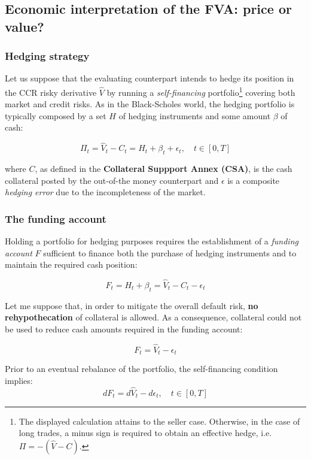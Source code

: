 \documentclass{beamer}
\begin{document}
\subsection{Economic interpretation of the FVA: price or value?}
\begin{frame}
\frametitle{Hedging strategy}


	Let us suppose that the evaluating counterpart intends to hedge its position in the CCR risky derivative $\hat{V}$ by running a \emph{self-financing} portfolio\footnote{The displayed calculation attains to the seller case. Otherwise, in the case of long trades, a minus sign is required to obtain an effective hedge, i.e. $\Pi = - (\hat{V} - C )$.} covering both market and credit risks. As in the Black-Scholes world, the hedging portfolio is typically composed by a set $H$ of hedging instruments and some amount  $\beta$ of cash:

	\begin{equation}
		\Pi_t = \hat{V}_t - C_t = H_t + \beta_t + \epsilon_t, \quad t \in [0,T]
	\end{equation}

	where $C$, as defined in the \textbf{Collateral Suppport Annex (CSA)}, is the cash collateral posted by the out-of-the money counterpart and $\epsilon$ is a composite \emph{hedging error} due to the incompleteness of the market.
\end{frame}

\begin{frame}
\frametitle{The funding account}
	Holding a portfolio for hedging purposes requires the establishment of a \emph{funding account} $F$ sufficient to finance both the purchase of hedging instruments and to maintain the required cash position:

	\begin{equation}
		F_t =  H_t + \beta_t = \hat{V}_t - C_t- \epsilon_t
	\end{equation}

	Let me suppose that, in order to mitigate the overall default risk, \textbf{no rehypothecation} of collateral is allowed. As a consequence, collateral could not be used to reduce cash amounts required in the funding account:

	$$
		F_t = \hat{V}_t - \epsilon_t
	$$

	Prior to an eventual rebalance of the portfolio, the self-financing condition implies:
	\begin{equation}
		dF_t = d\hat{V}_t - d\epsilon_t, \quad t \in [0,T]
	\end{equation}

\end{frame}
\end{document}
